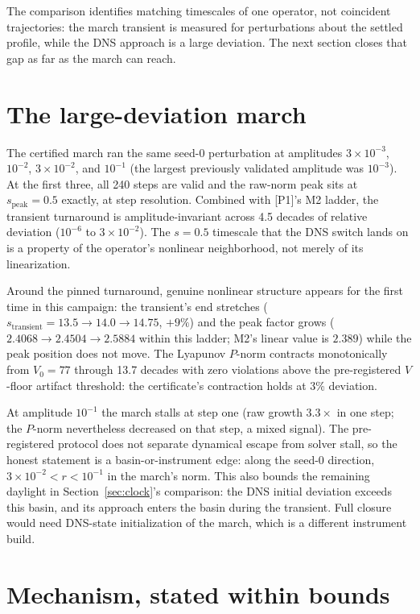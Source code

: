 \documentclass[11pt]{article}
\begin{document}
The comparison identifies matching timescales of one operator, not
coincident trajectories: the march transient is measured for
perturbations about the settled profile, while the DNS approach is a
large deviation. The next section closes that gap as far as the march
can reach.

\section{The large-deviation march}\label{sec:ld}

The certified march ran the same seed-0 perturbation at amplitudes
$3\times10^{-3}$, $10^{-2}$, $3\times10^{-2}$, and $10^{-1}$ (the
largest previously validated amplitude was $10^{-3}$). At the first
three, all 240 steps are valid and the raw-norm peak sits at
$s_{\mathrm{peak}}=0.5$ exactly, at step resolution. Combined with
[P1]'s M2 ladder, the transient turnaround is amplitude-invariant
across 4.5 decades of relative deviation ($10^{-6}$ to
$3\times10^{-2}$). The $s=0.5$ timescale that the DNS switch lands on
is a property of the operator's nonlinear neighborhood, not merely of
its linearization.

Around the pinned turnaround, genuine nonlinear structure appears for
the first time in this campaign: the transient's end stretches
($s_{\mathrm{transient}}=13.5\to14.0\to14.75$, $+9\%$) and the peak
factor grows ($2.4068\to2.4504\to2.5884$ within this ladder; M2's
linear value is $2.389$) while the peak position does not move. The
Lyapunov $P$-norm contracts monotonically from $V_0=77$ through 13.7
decades with zero violations above the pre-registered $V$-floor
artifact threshold: the certificate's contraction holds at 3\%
deviation.

At amplitude $10^{-1}$ the march stalls at step one (raw growth
$3.3\times$ in one step; the $P$-norm nevertheless decreased on that
step, a mixed signal). The pre-registered protocol does not separate
dynamical escape from solver stall, so the honest statement is a
basin-or-instrument edge: along the seed-0 direction,
$3\times10^{-2}<r<10^{-1}$ in the march's norm. This also bounds the
remaining daylight in Section~\ref{sec:clock}'s comparison: the DNS
initial deviation exceeds this basin, and its approach enters the
basin during the transient. Full closure would need DNS-state
initialization of the march, which is a different instrument build.

\section{Mechanism, stated within bounds}\label{sec:mechanism}
\end{document}
